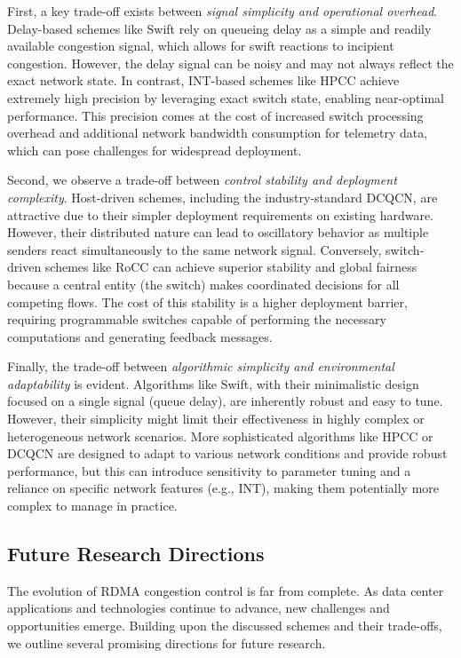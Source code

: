 \documentclass[11pt,en]{elegantpaper}
\begin{document}
First, a key trade-off exists between \textit{signal simplicity and operational overhead}. Delay-based schemes like Swift rely on queueing delay as a simple and readily available congestion signal, which allows for swift reactions to incipient congestion. However, the delay signal can be noisy and may not always reflect the exact network state. In contrast, INT-based schemes like HPCC achieve extremely high precision by leveraging exact switch state, enabling near-optimal performance. This precision comes at the cost of increased switch processing overhead and additional network bandwidth consumption for telemetry data, which can pose challenges for widespread deployment.

Second, we observe a trade-off between \textit{control stability and deployment complexity}. Host-driven schemes, including the industry-standard DCQCN, are attractive due to their simpler deployment requirements on existing hardware. However, their distributed nature can lead to oscillatory behavior as multiple senders react simultaneously to the same network signal. Conversely, switch-driven schemes like RoCC can achieve superior stability and global fairness because a central entity (the switch) makes coordinated decisions for all competing flows. The cost of this stability is a higher deployment barrier, requiring programmable switches capable of performing the necessary computations and generating feedback messages.

Finally, the trade-off between \textit{algorithmic simplicity and environmental adaptability} is evident. Algorithms like Swift, with their minimalistic design focused on a single signal (queue delay), are inherently robust and easy to tune. However, their simplicity might limit their effectiveness in highly complex or heterogeneous network scenarios. More sophisticated algorithms like HPCC or DCQCN are designed to adapt to various network conditions and provide robust performance, but this can introduce sensitivity to parameter tuning and a reliance on specific network features (e.g., INT), making them potentially more complex to manage in practice.

\subsection{Future Research Directions}
\label{subsec:future-directions}

The evolution of RDMA congestion control is far from complete. As data center applications and technologies continue to advance, new challenges and opportunities emerge. Building upon the discussed schemes and their trade-offs, we outline several promising directions for future research.
\end{document}
